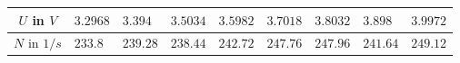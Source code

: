 \begin{tabular}{c|*{8}{*{1}{l}}}
$U$ in $\si{V}$ & $3.2968$ & $3.394$ & $3.5034$ & $3.5982$ & $3.7018$ & $3.8032$ & $3.898$ & $3.9972$ \\ \hline
$N$ in $\si{1/s}$ & $233.8$ & $239.28$ & $238.44$ & $242.72$ & $247.76$ & $247.96$ & $241.64$ & $249.12$\end{tabular}
